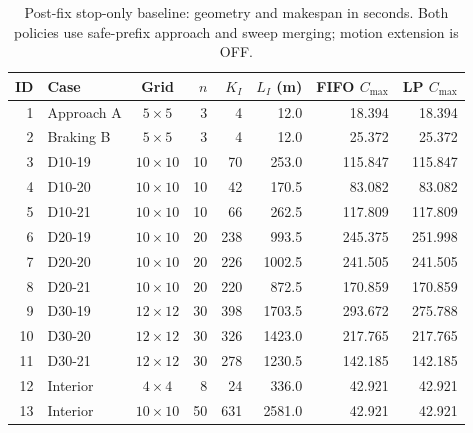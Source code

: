 \begin{table}[htbp]
\centering\small
\setlength{\tabcolsep}{4pt}
\caption{Post-fix stop-only baseline: geometry and makespan in seconds. Both policies use safe-prefix approach and sweep merging; motion extension is OFF.}
\label{tab:stop-baseline-makespan}
\begin{tabular}{rlcrrrrr}
\toprule
ID & Case & Grid & $n$ & $K_I$ & $L_I$ (m) & FIFO $C_{\max}$ & LP $C_{\max}$\\
\midrule
1 & Approach A & $5\times5$ & 3 & 4 & 12.0 & 18.394 & 18.394\\
2 & Braking B & $5\times5$ & 3 & 4 & 12.0 & 25.372 & 25.372\\
3 & D10-19 & $10\times10$ & 10 & 70 & 253.0 & 115.847 & 115.847\\
4 & D10-20 & $10\times10$ & 10 & 42 & 170.5 & 83.082 & 83.082\\
5 & D10-21 & $10\times10$ & 10 & 66 & 262.5 & 117.809 & 117.809\\
6 & D20-19 & $10\times10$ & 20 & 238 & 993.5 & 245.375 & 251.998\\
7 & D20-20 & $10\times10$ & 20 & 226 & 1002.5 & 241.505 & 241.505\\
8 & D20-21 & $10\times10$ & 20 & 220 & 872.5 & 170.859 & 170.859\\
9 & D30-19 & $12\times12$ & 30 & 398 & 1703.5 & 293.672 & 275.788\\
10 & D30-20 & $12\times12$ & 30 & 326 & 1423.0 & 217.765 & 217.765\\
11 & D30-21 & $12\times12$ & 30 & 278 & 1230.5 & 142.185 & 142.185\\
12 & Interior & $4\times4$ & 8 & 24 & 336.0 & 42.921 & 42.921\\
13 & Interior & $10\times10$ & 50 & 631 & 2581.0 & 42.921 & 42.921\\
\bottomrule
\end{tabular}
\end{table}

